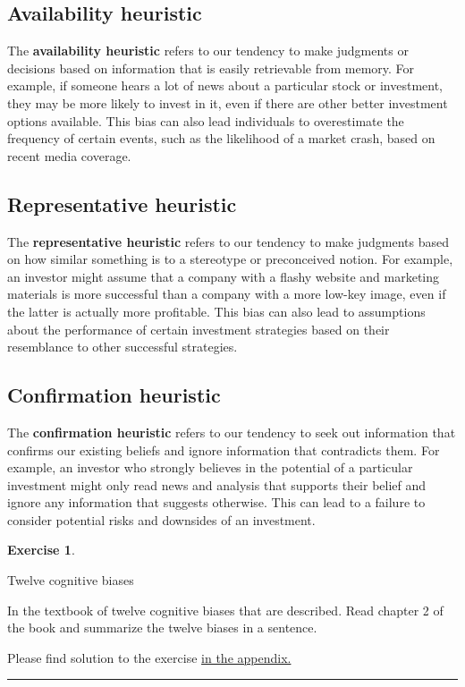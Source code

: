 \documentclass[
  12pt,
  oneside]{book}
\theoremstyle{definition}
\theoremstyle{definition}
\theoremstyle{definition}
\newtheorem{exercise}{Exercise}[chapter]
\theoremstyle{definition}
\theoremstyle{remark}
\begin{document}
\subsection{Availability heuristic}\label{availability-heuristic}

The \textbf{availability heuristic} refers to our tendency to make judgments or decisions based on information that is easily retrievable from memory. For example, if someone hears a lot of news about a particular stock or investment, they may be more likely to invest in it, even if there are other better investment options available. This bias can also lead individuals to overestimate the frequency of certain events, such as the likelihood of a market crash, based on recent media coverage.

\subsection{Representative heuristic}\label{representative-heuristic}

The \textbf{representative heuristic} refers to our tendency to make judgments based on how similar something is to a stereotype or preconceived notion. For example, an investor might assume that a company with a flashy website and marketing materials is more successful than a company with a more low-key image, even if the latter is actually more profitable. This bias can also lead to assumptions about the performance of certain investment strategies based on their resemblance to other successful strategies.

\subsection{Confirmation heuristic}\label{confirmation-heuristic}

The \textbf{confirmation heuristic} refers to our tendency to seek out information that confirms our existing beliefs and ignore information that contradicts them. For example, an investor who strongly believes in the potential of a particular investment might only read news and analysis that supports their belief and ignore any information that suggests otherwise. This can lead to a failure to consider potential risks and downsides of an investment.

\begin{exercise}
\protect\hypertarget{exr:bazermanbias}{}\label{exr:bazermanbias}

Twelve cognitive biases

In the textbook of \citet{Bazerman2017Judgement} twelve cognitive biases that are described. Read chapter 2 of the book and summarize the twelve biases in a sentence.

Please find solution to the exercise \hyperref[sol:bazermanbias]{in the appendix.}

\begin{center}\rule{0.5\linewidth}{0.5pt}\end{center}

\end{exercise}
\end{document}
